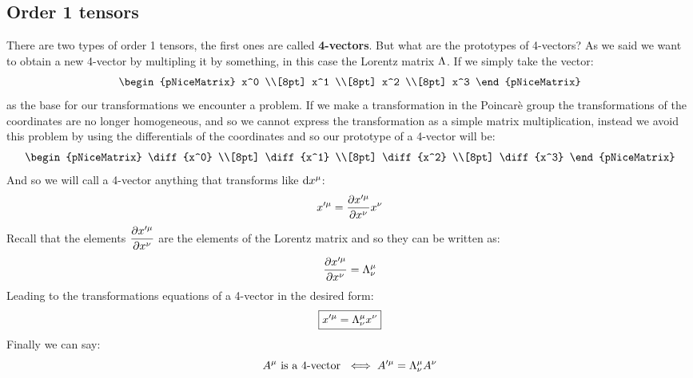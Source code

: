 \subsection{Order 1 tensors}
There are two types of order 1 tensors, the first ones are called \textbf{4-vectors}. But what are the prototypes of 4-vectors? As we said we want to obtain a new 4-vector by multipling it by something, in this case the Lorentz matrix $\Lambda$. If we simply take the vector:
\begin{equation}
  \begin{pNiceMatrix}
    x^0 \\[8pt]
    x^1 \\[8pt]
    x^2 \\[8pt]
    x^3
  \end{pNiceMatrix}
\end{equation}
as the base for our transformations we encounter a problem. If we make a transformation in the Poincarè group the transformations of the coordinates are no longer homogeneous, and so we cannot express the transformation as a simple matrix multiplication, instead we avoid this problem by using the differentials of the coordinates and so our prototype of a 4-vector will be:
\begin{equation}
  \begin{pNiceMatrix}
    \diff{x^0} \\[8pt]
    \diff{x^1} \\[8pt]
    \diff{x^2} \\[8pt]
    \diff{x^3}
  \end{pNiceMatrix}
\end{equation}
And so we will call a 4-vector anything that transforms like $\mathrm{d}x^{\mu}$:
\begin{equation}
  x'^{\mu} = \pdv{x'^{\mu}}{x^{\nu}} x^{\nu}
\end{equation}
Recall that the elements $\pdv{x'^{\mu}}{x^{\nu}}$ are the elements of the Lorentz matrix and so they can be written as:
\begin{equation}
  \pdv{x'^{\mu}}{x^{\nu}} = \lm^{\mu}_{\nu}
\end{equation}
Leading to the transformations equations of a 4-vector in the desired form:
\begin{equation}
  \boxed{x'^{\mu} = \Lambda^{\mu}_{\nu} x^{\nu}}
\end{equation}
Finally we can say:
\begin{equation}
  \tensor{A}{^{\mu}} \text{ is a 4-vector } \iff A'^{\mu} = \lm^{\mu}_{\nu} \tensor{A}{^{\nu}}
\end{equation}
